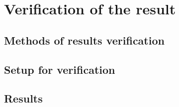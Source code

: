 \chapter{Verification of the result} \label{verification}

\section{Methods of results verification}

\section{Setup for verification}

\section{Results}